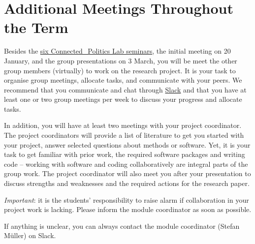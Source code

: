 \documentclass[abstract=on,parskip=full,headings=standardclasses,fontsize=11pt,paper=a4]{scrartcl}
\begin{document}
\section{Additional Meetings Throughout the Term}

Besides the \href{https://www.ucd.ie/connected_politics/events/}{six Connected\_Politics Lab seminars}, the initial meeting on 20 January, and the group presentations on 3 March, you will be meet the other group members (virtually) to work on  the research project. It is your task to organise group meetings, allocate tasks, and communicate with your peers. We recommend that you communicate and chat through \href{https://ucdconnectedpolitics.slack.com.}{Slack} and that you have at least one or two  group meetings  per week to discuss your progress and allocate  tasks. 


 In addition, you will have at least two meetings with your project coordinator. The project coordinators will provide a list of literature to get you started with your project, answer selected questions about methods or software. Yet, it is your task to get familiar with prior work, the required software packages and writing code -- working with software and coding collaboratively are integral parts of the group work. The project coordinator will also meet you after your presentation to discuss strengths and weaknesses and the required actions for the research paper.


\textit{Important}: it is the students' responsibility to raise alarm if collaboration in your project work is lacking. Please inform the module coordinator as soon as possible.


If anything is unclear, you can always contact the module coordinator (Stefan Müller) on  Slack.
\end{document}
